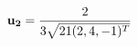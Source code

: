 \documentclass[preview]{standalone}
\begin{document}
\begin{align*}
\mathbf{u_2}    =   {2 \over 3 \sqrt{21  (2, 4, -1)^T }}
\end{align*}
\end{document}
